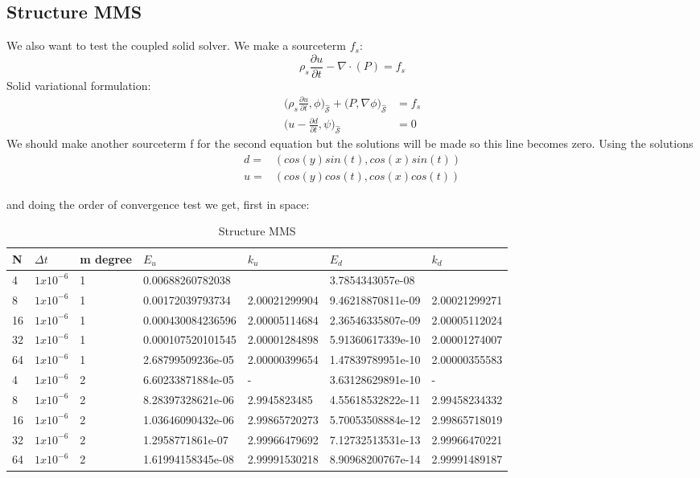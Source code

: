 \newpage
\subsection{Structure MMS}
We also want to test the coupled solid solver. We make a sourceterm $f_s$:
$$\rho_s \frac{\partial u}{\partial t} - \nabla \cdot ( P ) = f_s $$
Solid variational formulation:
\begin{align}
\big(\rho_s \frac{\partial u}{\partial t},\phi \big)_{\mathcal{\hat{S}}} + \big(P, \nabla \phi \big)_{\mathcal{\hat{S}}} &=f_s \\
\big( u- \frac{\partial d}{\partial t} ,\psi \big)_{\mathcal{\hat{S}}} &= 0 
\end{align}
We should make another sourceterm f for the second equation but the solutions will be made so this line becomes zero.
Using the solutions 
\begin{align*}
d =& ( cos(y)sin(t) , cos(x)sin(t) )\\
u =& ( cos(y)cos(t), cos(x)cos(t) )
\end{align*}



and doing the order of convergence test we get, first in space:

\begin{table}[h!]
\centering
\caption{Structure MMS}
\label{my-label}
\begin{tabular}{|l|l|l|l|l|l|l|}
\hline
N & $\Delta t$ & m degree & $E_u$ & $k_u$ & $E_d$ & $k_d$ \\ \hline
4 & $1x10^{-6}$ & 1 & 0.00688260782038 &  & 3.7854343057e-08 &  \\ \hline
8 & $1x10^{-6}$ & 1 & 0.00172039793734 & 2.00021299904 & 9.46218870811e-09 & 2.00021299271 \\ \hline
16 & $1x10^{-6}$ & 1 & 0.000430084236596 & 2.00005114684 & 2.36546335807e-09 & 2.00005112024 \\ \hline
32 & $1x10^{-6}$ & 1 & 0.000107520101545 & 2.00001284898 & 5.91360617339e-10 & 2.00001274007 \\ \hline
64 & $1x10^{-6}$ & 1 & 2.68799509236e-05 & 2.00000399654 & 1.47839789951e-10 & 2.00000355583 \\ \hline
4 & $1x10^{-6}$ & 2 & 6.60233871884e-05 & - & 3.63128629891e-10 & - \\ \hline
8 & $1x10^{-6}$ & 2 & 8.28397328621e-06 & 2.9945823485 & 4.55618532822e-11 & 2.99458234332 \\ \hline
16 & $1x10^{-6}$ & 2 & 1.03646090432e-06 & 2.99865720273 & 5.70053508884e-12 & 2.99865718019 \\ \hline
32 & $1x10^{-6}$ & 2 & 1.2958771861e-07 & 2.99966479692 & 7.12732513531e-13 & 2.99966470221 \\ \hline
64 & $1x10^{-6}$ & 2 & 1.61994158345e-08 & 2.99991530218 & 8.90968200767e-14 & 2.99991489187 \\ \hline
\end{tabular}
\end{table}

